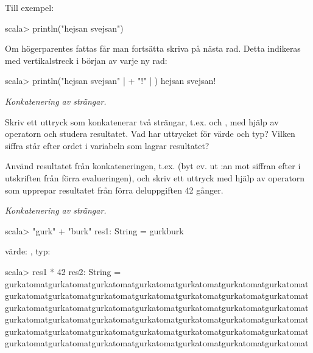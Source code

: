 \SOLUTION 
\TaskSolved \what

\SubtaskSolved Till exempel:
\begin{REPLnonum}
scala> println("hejsan svejsan")
\end{REPLnonum}

\SubtaskSolved Om högerparentes fattas får man fortsätta skriva på nästa rad. Detta indikeras med vertikalstreck i början av varje ny rad:
\begin{REPLnonum}
scala> println("hejsan svejsan"
     | + "!" 
     | )
hejsan svejsan!
\end{REPLnonum}

\QUESTEND



\def\what{\emph{Konkatenering av strängar.}}

\QUESTBEGIN

\Task \what

\Subtask Skriv ett uttryck som konkatenerar två strängar, t.ex.  och , med hjälp av operatorn \code{+} och studera resultatet. Vad har uttrycket för värde och typ? Vilken siffra står efter ordet  i variabeln som lagrar resultatet?

\Subtask Använd resultatet från konkateneringen, t.ex.  (byt ev. ut :an mot siffran efter  i utskriften från förra evalueringen), och skriv ett uttryck med hjälp av operatorn \code{*} som upprepar resultatet från förra deluppgiften 42 gånger. 


\SOLUTION

\TaskSolved \what

\SubtaskSolved 
\begin{REPLnonum}
scala> "gurk" + "burk"
res1: String = gurkburk
\end{REPLnonum}
värde: , typ:  

\SubtaskSolved
\begin{REPLnonum}
scala> res1 * 42
res2: String = gurkatomatgurkatomatgurkatomatgurkatomatgurkatomatgurkatomatgurkatomatgurkatomatgurkatomatgurkatomatgurkatomatgurkatomatgurkatomatgurkatomatgurkatomatgurkatomatgurkatomatgurkatomatgurkatomatgurkatomatgurkatomatgurkatomatgurkatomatgurkatomatgurkatomatgurkatomatgurkatomatgurkatomatgurkatomatgurkatomatgurkatomatgurkatomatgurkatomatgurkatomatgurkatomatgurkatomatgurkatomatgurkatomatgurkatomatgurkatomatgurkatomatgurkatomat
\end{REPLnonum}

\QUESTEND




